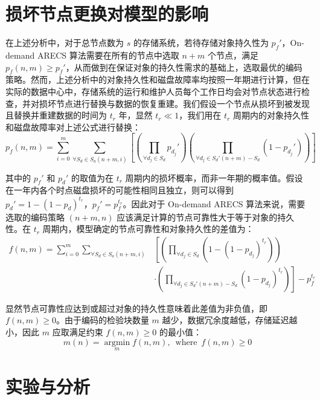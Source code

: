 \section{损坏节点更换对模型的影响}
在上述分析中，对于总节点数为 $s$ 的存储系统，若待存储对象持久性为 $p_{f}'$，On-demand ARECS 算法需要在所有的节点中选取 $n+m$ 个节点，满足 $p_{f}(n,m) \geq p_{f}'$，从而做到在保证对象的持久性需求的基础上，选取最优的编码策略。然而，上述分析中的对象持久性和磁盘故障率均按照一年期进行计算，但在实际的数据中心中，存储系统的运行和维护人员每个工作日均会对节点状态进行检查，并对损坏节点进行替换与数据的恢复重建。我们假设一个节点从损坏到被发现且替换并重建数据的时间为 $t_{r}$ 年，显然 $t_{r}{\ll}1$，我们用在 $t_{r}$ 周期内的对象持久性和磁盘故障率对上述公式进行替换：
\begin{equation}
p_{f}(n,m)=\sum_{i=0}^{m}\sum_{{\forall}S_{d}{\in}S_{a}(n+m,i)}\left[\left(\prod_{{\forall}d_{j}{\in}S_{d}}{p_{d_j}'}\right)\left(\prod_{{\forall}d_{j}{\in}S_{d}'(n+m)-S_{d}}(1-p_{d_j}')\right)\right]
\end{equation}

其中的 $p_{f}'$ 和 $p_{d}'$ 的取值为在 $t_{r}$ 周期内的损坏概率，而非一年期的概率值。假设在一年内各个时点磁盘损坏的可能性相同且独立，则可以得到 $p_{d}'=1-(1-p_{d})^{t_{r}}$，$p_{f}'=p_{f}^{t_{r}}$。因此对于 On-demand ARECS 算法来说，需要选取的编码策略 $(n+m,n)$ 应该满足计算的节点可靠性大于等于对象的持久性。在 $t_{r}$ 周期内，模型确定的节点可靠性和对象持久性的差值为：
\begin{equation}
\begin{split}
f(n,m)=\sum_{i=0}^{m}\sum_{{\forall}S_{d}{\in}S_{a}(n+m,i)}&\left[\left(\prod_{{\forall}d_{j}{\in}S_{d}}\left(1-(1-p_{d_j})^{t_r}\right)\right)\right.\\
&\cdot\left.\left(\prod_{{\forall}d_{j}{\in}S_{d}'(n+m)-S_{d}}(1-p_{d_j})^{t_{r}}\right)\right]-p_{f}^{t_{r}}
\end{split}
\end{equation}

显然节点可靠性应达到或超过对象的持久性意味着此差值为非负值，即 $f(n,m) \geq 0$。由于编码的检验块数量 $m$ 越少，数据冗余度越低，存储延迟越小，因此 $m$ 应取满足约束 $f(n,m) \geq 0$ 的最小值：
\begin{equation}
m(n)=\operatorname*{argmin}_{m}f(n,m),\ \operatorname*{where}\ f(n,m) \geq 0
\end{equation}
\section{实验与分析}
